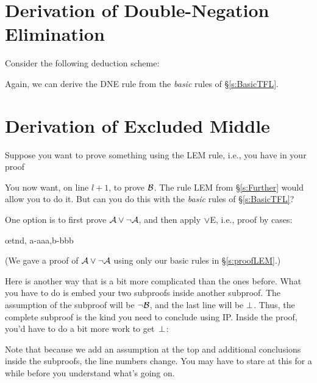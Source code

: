 \section{Derivation of Double-Negation Elimination}
Consider the following deduction scheme:
	\begin{fitchproof}
	\open
	\close
\end{fitchproof}
Again,  we can derive the DNE rule from the \emph{basic} rules of \S\ref{s:BasicTFL}.

\section{Derivation of Excluded Middle}
Suppose you want to prove something using the LEM rule, i.e., you have in your proof
\begin{fitchproof}
  \open
  \close
  \open
  \close
\end{fitchproof}
You now want, on line $l+1$, to prove $\mathcal{B}$. The rule LEM from
\S\ref{s:Further} would allow you to do it. But can you do this with
the \emph{basic} rules of \S\ref{s:BasicTFL}?

One option is to first prove $\mathcal{A} \vee \neg\mathcal{A}$, and then apply $\vee$E, i.e., proof by cases:
\begin{fitchproof}
  \open
  \close
  \open
  \close
  \ellipsesline
  \oe{tnd, a-aaa,b-bbb}
\end{fitchproof}
(We gave a proof of $\mathcal{A} \vee \neg\mathcal{A}$ using only our basic rules in \S\ref{s:proofLEM}.)

Here is another way that is a bit more complicated than the ones before. What you have to do is embed your two subproofs inside another subproof. The assumption of the subproof will be $\neg \mathcal{B}$, and the last line will be $\bot$. Thus, the complete subproof is the kind you need to conclude  using IP. Inside the proof, you'd have to do a bit more work to get~$\bot$:
\begin{fitchproof}
  \open
  \open
  \ellipsesline
  \close
  \open
  \ellipsesline
  \close
  \close
\end{fitchproof}
Note that because we add an assumption at the top and additional conclusions inside the subproofs, the line numbers change. You may have to stare at this for a while before you understand what's going on.



